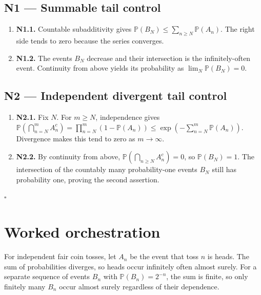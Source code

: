 \documentclass[preprint,12pt,aps,pra,showkeys,amsmath,amssymb,superscriptaddress,floatfix]{revtex4-2}
\theoremstyle{definition}
\theoremstyle{remark}
\begin{document}
\subsection{N1 --- Summable tail
control}\label{n1-summable-tail-control}

\begin{enumerate}
\def\labelenumi{\arabic{enumi}.}
\item
  \textbf{N1.1.} Countable subadditivity gives
  \(\mathbb P(B_N)\le\sum_{n\ge N}\mathbb P(A_n)\). The right side tends
  to zero because the series converges.
\item
  \textbf{N1.2.} The events \(B_N\) decrease and their intersection is
  the infinitely-often event. Continuity from above yields its
  probability as \(\lim_N\mathbb P(B_N)=0\).
\end{enumerate}

\subsection{N2 --- Independent divergent tail
control}\label{n2-independent-divergent-tail-control}

\begin{enumerate}
\def\labelenumi{\arabic{enumi}.}
\item
  \textbf{N2.1.} Fix \(N\). For \(m\ge N\), independence gives
  \(\mathbb P(\bigcap_{n=N}^m A_n^c)=\prod_{n=N}^m(1-\mathbb P(A_n))\le\exp(-\sum_{n=N}^m\mathbb P(A_n))\).
  Divergence makes this tend to zero as \(m\to\infty\).
\item
  \textbf{N2.2.} By continuity from above,
  \(\mathbb P(\bigcap_{n\ge N}A_n^c)=0\), so \(\mathbb P(B_N)=1\). The
  intersection of the countably many probability-one events \(B_N\)
  still has probability one, proving the second assertion.
\end{enumerate}

\hfill$\square$

\section{Worked orchestration}

For independent fair coin tosses, let \(A_n\) be the event that toss
\(n\) is heads. The sum of probabilities diverges, so heads occur
infinitely often almost surely. For a separate sequence of events
\(B_n\) with \(\mathbb P(B_n)=2^{-n}\), the sum is finite, so only
finitely many \(B_n\) occur almost surely regardless of their
dependence.
\end{document}
